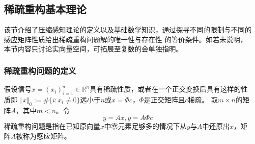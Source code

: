 \subsection{稀疏重构基本理论}
该节介绍了压缩感知理论的定义以及基础数学知识，通过探寻不同的限制与不同的感应矩阵性质给出稀疏重构问题解的唯一性与存在性
的等价条件。如若未说明，本节内容只讨论实向量空间，可拓展至复数的会单独指明。
\subsubsection{稀疏重构问题的定义}
假设信号$x=\left(x_i\right)^n_{i=1}\in \mathbb{R}^n$具有稀疏性质，或者在一个正交变换后具有这样的性质即
$\Vert x\Vert_0:=\# \{i:x_i \neq 0\}$远小于$n$或$x=\Phi c$，$\Phi$是正交矩阵且$c$稀疏。
取$m\times n$的矩阵$A$，其中$m<n$。令
\begin{equation}
    y=Ax,y=A\Phi c
\end{equation}
稀疏重构问题是指在已知原向量$x$中零元素足够多的情况下从$y$与$A$中还原出$x$，矩阵$A$被称为感应矩阵。

